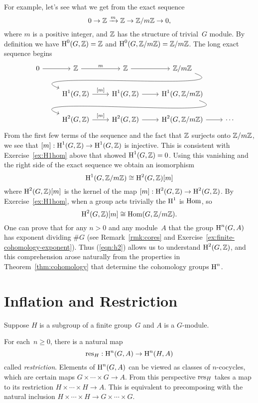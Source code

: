 For example, let's see what we get from the exact sequence
$$
	0 \to \mathbb{Z} \xrightarrow{m} \mathbb{Z} \to \mathbb{Z}/m\mathbb{Z} \to 0,
$$
where $m$ is a positive integer, and $\mathbb{Z}$ has the structure of
trivial~$G$ module.  By definition we have
$\operatorname{H}^0(G,\mathbb{Z}) = \mathbb{Z}$ and $\operatorname{H}^0(G,\mathbb{Z}/m\mathbb{Z})=\mathbb{Z}/m\mathbb{Z}$.
The long exact sequence begins
$$
	\begin{tikzcd}
		0 \rar & \Z \rar{m} & \Z \rar & \Z/m\Z \ar[out=-20, in=160]{dll}
		\\
		& \H^1(G,\Z) \rar{[m]} & \H^1(G,\Z) \rar & \H^1(G,\Z/m\Z) \ar[out=-20, in=160]{dll}
		\\
		& \H^2(G,\Z) \rar{[m]} & \H^2(G,\Z) \rar & \H^2(G,\Z/m\Z) \rar & \cdots
	\end{tikzcd}
$$
From the first few terms of the sequence and the fact
that $\mathbb{Z}$ surjects onto $\mathbb{Z}/m\mathbb{Z}$, we see that
$[m]:\operatorname{H}^1(G,\mathbb{Z}) \to \operatorname{H}^1(G,\mathbb{Z})$ is injective.
This is consistent with Exercise~\ref{ex:H1hom} above that
showed $\operatorname{H}^1(G,\mathbb{Z}) = 0$. Using this vanishing and the right side
of the exact sequence we obtain an isomorphism
$$
	\operatorname{H}^1(G,\mathbb{Z}/m\mathbb{Z}) \cong \operatorname{H}^2(G,\mathbb{Z})[m]
$$
where $\operatorname{H}^2(G,\mathbb{Z})[m]$ is the kernel of the map
$[m]:\operatorname{H}^2(G,\mathbb{Z}) \to \operatorname{H}^2(G,\mathbb{Z})$.
By Exercise~\ref{ex:H1hom}, when a group acts trivially the $\operatorname{H}^1$
is $\operatorname{Hom}$, so
\begin{equation}\label{eqn:h2}
	\operatorname{H}^2(G,\mathbb{Z})[m] \cong \operatorname{Hom}(G,\mathbb{Z}/m\mathbb{Z}).
\end{equation}
One can prove that for any $n>0$ and any module~$A$ that the group
$\operatorname{H}^n(G,A)$ has exponent dividing $\#G$ (see Remark~\ref{rmk:cores}
and Exercise~\ref{ex:finite-cohomology-exponent}).
Thus (\ref{eqn:h2}) allows us to understand $\operatorname{H}^2(G,\mathbb{Z})$,
and this comprehension arose naturally from the properties in 
Theorem~\ref{thm:cohomology} that determine the cohomology groups $\operatorname{H}^n$.

\section{Inflation and Restriction}

Suppose $H$ is a subgroup of a finite group~$G$ and $A$
is a $G$-module.

For each~$n\geq 0$, there is a natural map
$$
	\operatorname{res}_H : \operatorname{H}^n(G,A) \to \operatorname{H}^n(H,A)
$$
called \emph{restriction}. Elements of $\operatorname{H}^n(G,A)$ can be
viewed as classes of $n$-cocycles, which are certain maps
$G \times \cdots \times G \to A$. From this perspective $\operatorname{res}_H$
takes a map to its restriction $H \times \cdots \times H \to A$.
This is equivalent to precomposing with the natural inclusion
$H\times\cdots\times H \to G\times\cdots\times G$.


